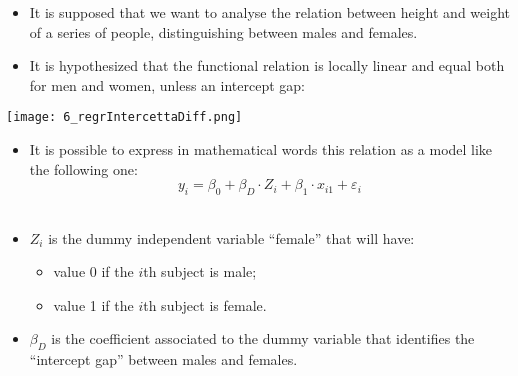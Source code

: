 
\begin{frame}
  \vspace*{.25cm}
  \begin{itemize}
    \item It is supposed that we want to analyse the relation between height and weight of a series of people, distinguishing between males and females.
    \item It is hypothesized that the functional relation is locally linear and equal both for men and women, unless an intercept gap:
  \end{itemize}
  \begin{center}
    \texttt{[image: 6\_regrIntercettaDiff.png]}
  \end{center}
\end{frame}

\begin{frame}
  \vspace*{.25cm}
  \begin{itemize}
    \item It is possible to express in mathematical words this relation as a model like the following one:
    \vspace{-0.3cm} $$ y_i = \beta_0 + \beta_D \cdot Z_i + \beta_1 \cdot x_{i1} + \varepsilon_i $$\\
    \vspace{0.2cm}
    \item $Z_i$ is the dummy independent variable ``female'' that will have:
    \begin{itemize}
      \item value 0 if the $i$th subject is male;
      \item value 1 if the $i$th subject is female.
    \end{itemize}
    \vspace{0.25cm}
    \item $ \beta_D $ is the coefficient associated to the dummy variable that identifies the ``intercept gap'' between males and females.
  \end{itemize}
\end{frame}

